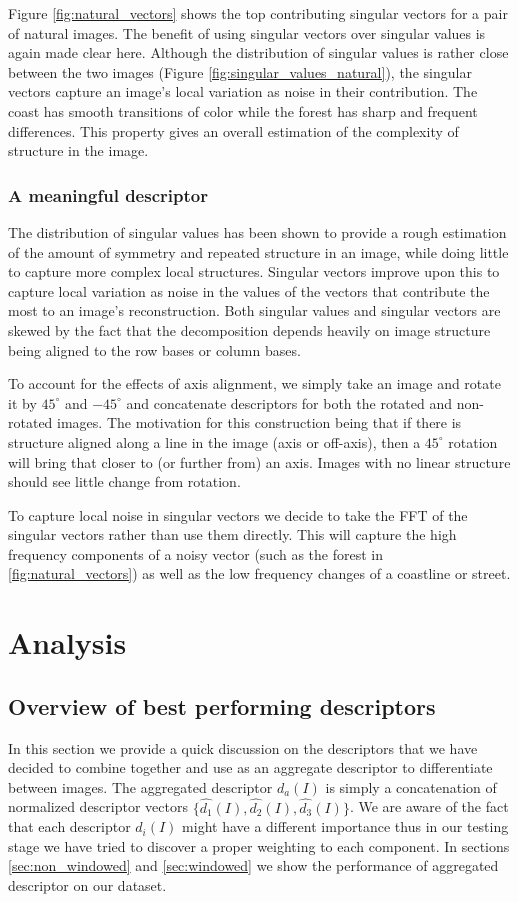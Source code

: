 \documentclass{report}
\begin{document}
Figure \ref{fig:natural_vectors} shows the top contributing singular vectors for a pair of natural images. The benefit of using singular vectors over singular values is again made clear here. Although the distribution of singular values is rather close between the two images (Figure \ref{fig:singular_values_natural}), the singular vectors capture an image's local variation as noise in their contribution. The coast has smooth transitions of color while the forest has sharp and frequent differences. This property gives an overall estimation of the complexity of structure in the image.

\subsection{A meaningful descriptor}
\label{sec:SVDDescriptor}
The distribution of singular values has been shown to provide a rough estimation of the amount of symmetry and repeated structure in an image, while doing little to capture more complex local structures. Singular vectors improve upon this to capture local variation as noise in the values of the vectors that contribute the most to an image's reconstruction. Both singular values and singular vectors are skewed by the fact that the decomposition depends heavily on image structure being aligned to the row bases or column bases.

To account for the effects of axis alignment, we simply take an image and rotate it by $45^\circ$ and $-45^\circ$ and concatenate descriptors for both the rotated and non-rotated images. The motivation for this construction being that if there is structure aligned along a line in the image (axis or off-axis), then a $45^\circ$ rotation will bring that closer to (or further from) an axis. Images with no linear structure should see little change from rotation.

To capture local noise in singular vectors we decide to take the FFT of the singular vectors rather than use them directly. This will capture the high frequency components of a noisy vector (such as the forest in \ref{fig:natural_vectors}) as well as the low frequency changes of a coastline or street.

\chapter{Analysis}
\label{chap:analysis}


\section{Overview of best performing descriptors}
In this section we provide a quick discussion on the descriptors that we have decided to combine together and use as an aggregate descriptor to differentiate between images. The aggregated descriptor $d_a(I)$ is simply a concatenation of normalized descriptor vectors $\{\hat{d_1}(I), \hat{d_2}(I), \hat{d_3}(I)\}$. We are aware of the fact that each descriptor $d_i(I)$ might have a different importance thus in our testing stage we have tried to discover a proper weighting to each component. In sections \ref{sec:non_windowed} and \ref{sec:windowed} we show the performance of aggregated descriptor on our dataset.
\end{document}
